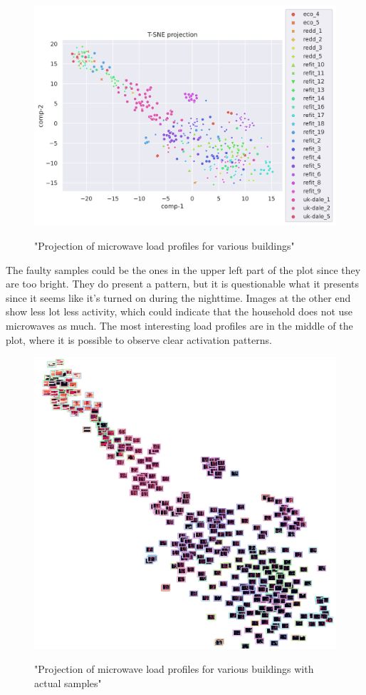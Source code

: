 \begin{figure}[H]
	\centering
	\caption{"Projection of microwave load profiles for various buildings"}
	\includegraphics[width=1.2\textwidth]{Figures/TSNE/TSNE_per_appliance/all/scatter_all_microwave.png}
	\label{fig:tsne_pa_scatter_all_microwave}
\end{figure}

The faulty samples could be the ones in the upper left part of the plot since they are too bright.
They do present a pattern, but it is questionable what it presents since it seems like it's turned on 
during the nighttime. Images at the other end show less lot less activity, which could indicate that
the household does not use microwaves as much. The most interesting load profiles are in the middle of the 
plot, where it is possible to observe clear activation patterns. 

\begin{figure}[H]
	\centering
	\caption{"Projection of microwave load profiles for various buildings with actual samples"}
	\includegraphics[width=.9\textwidth]{Figures/TSNE/TSNE_per_appliance/all/img_scatter_allmicrowave.png}
	\label{fig:tsne_pa_img_scatter_all_microwave}
\end{figure}

